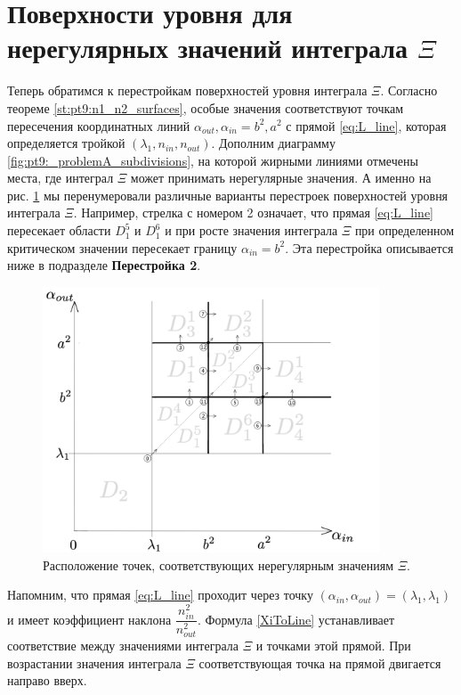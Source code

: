 \section{Поверхности уровня для нерегулярных значений интеграла $\Xi$}\label{sec:ch4/sec2}
Теперь обратимся к перестройкам поверхностей уровня интеграла $\Xi$. 
Согласно теореме \ref{st:pt9:n1_n2_surfaces}, особые значения соответствуют точкам пересечения координатных линий $\alpha_{out}, \alpha_{in} = b^2, a^2$ с прямой \eqref{eq:L_line}, которая определяется тройкой $(\lambda_1, n_{in}, n_{out})$.
Дополним диаграмму  \ref{fig:pt9:_problemA_subdivisions}, на которой жирными линиями отмечены места, где интеграл $\Xi$ может принимать нерегулярные значения. А именно на рис. \ref{fig:pt9:_diagramPlusIrregular} мы перенумеровали различные варианты перестроек поверхностей уровня интеграла $\Xi$. 
Например, стрелка с номером 2 означает, что прямая \eqref{eq:L_line} пересекает области $D_1^5$ и $D_1^6$ и при росте значения интеграла $\Xi$ при определенном критическом значении пересекает границу $\alpha_{in} = b^2$. Эта перестройка описывается ниже в подразделе \textbf{Перестройка 2}.

\begin{figure}[!htb]
\centering
\includegraphics[width=10cm]{images/ch4/section2/diagramPlusIrregular.pdf}
    \caption{Расположение точек, соответствующих нерегулярным значениям $\Xi$.}
    \label{fig:pt9:_diagramPlusIrregular}
\end{figure}

Напомним, что прямая  \eqref{eq:L_line} проходит через точку $(\alpha_{in}, \alpha_{out}) = (\lambda_1, \lambda_1)$ и имеет коэффициент наклона $\dfrac{n_{in}^2}{n_{out}^2}$. Формула \eqref{XiToLine} устанавливает соответствие между значениями интеграла $\Xi$ и точками этой прямой. При возрастании значения интеграла $\Xi$ соответствующая точка на прямой двигается направо вверх. 


